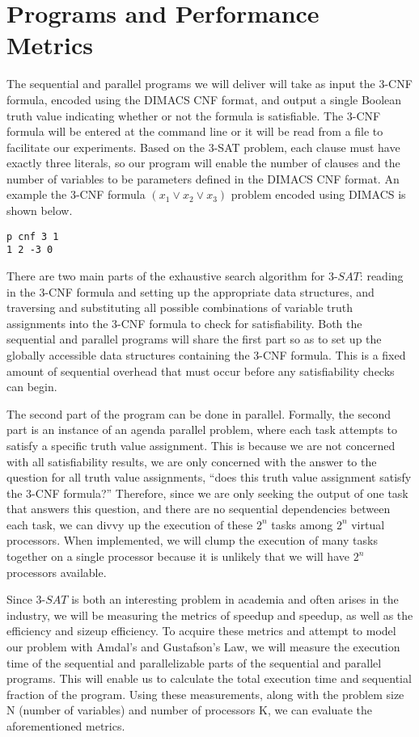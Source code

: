 \documentclass[paper=a4, fontsize=10pt]{scrartcl} %
\begin{document}
\section{Programs and Performance Metrics}
The sequential and parallel programs we will deliver will take as input 
the 3-CNF formula, encoded using the DIMACS CNF format, 
and output a single Boolean truth value indicating whether or not the 
formula is satisfiable. The 3-CNF formula will be entered at the command 
line or it will be read from a file to facilitate our experiments. Based on 
the 3-SAT problem, each clause must have exactly three literals, so our 
program will enable the number of clauses and the number of variables 
to be parameters defined in the DIMACS CNF format. An example the 
3-CNF formula $(x_1 \lor x_2 \lor x_3)$ problem encoded using DIMACS is shown below.
\begin{center}
\begin{lstlisting}
p cnf 3 1
1 2 -3 0
\end{lstlisting}
\end{center}
There are two main parts of the exhaustive search algorithm for $3$-$SAT$: 
reading in the 3-CNF formula and setting up the appropriate data structures, 
and traversing and substituting all possible combinations of variable truth 
assignments into the 3-CNF formula to check for satisfiability. Both the 
sequential and parallel programs will share the first part so as to set up 
the globally accessible data structures containing the 3-CNF formula. 
This is a fixed amount of sequential overhead that must occur before any 
satisfiability checks can begin. 

The second part of the program can be done in parallel. Formally, the 
second part is an instance of an agenda parallel problem, where each 
task attempts to satisfy a specific truth value assignment. This is because 
we are not concerned with all satisfiability results, we are only concerned 
with the answer to the question for all truth value assignments, ``does this 
truth value assignment satisfy the 3-CNF formula?'' Therefore, since we 
are only seeking the output of one task that answers this question, and 
there are no sequential dependencies between each task, we can divvy 
up the execution of these $2^n$ tasks among $2^n$ virtual processors. When 
implemented, we will clump the execution of many tasks together on a single 
processor because it is unlikely that we will have $2^n$ processors available. 

Since $3$-$SAT$ is both an interesting problem in academia and often arises in 
the industry, we will be measuring the metrics of speedup and speedup, as 
well as the efficiency and sizeup efficiency. To acquire these metrics and 
attempt to model our problem with Amdal's and Gustafson's Law, we will 
measure the execution time of the sequential and parallelizable parts of 
the sequential and parallel programs. This will enable us to calculate the 
total execution time and sequential fraction of the program. Using these 
measurements, along with the problem size N (number of variables) and 
number of processors K, we can evaluate the aforementioned metrics. 
\end{document}
